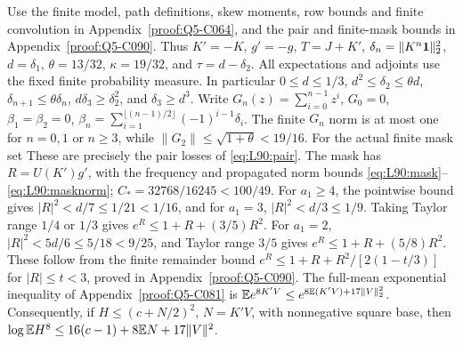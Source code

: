 Use the finite model, path definitions, skew moments, row bounds and
finite convolution in Appendix~\ref{proof:Q5-C064}, and the pair and
finite-mask bounds in Appendix~\ref{proof:Q5-C090}.
Thus \(K'=\allowbreak -K\), \(g'=\allowbreak -g\), \(T=\allowbreak J+K'\),
\(\delta_n=\allowbreak \|K^n\mathbf1\|_2^2\), \(d=\allowbreak \delta_1\),
\(\theta=\allowbreak 13/32\), \(\kappa=\allowbreak 19/32\), and \(\tau=\allowbreak d-\delta_2\).
All expectations and adjoints use the fixed finite probability measure.
In particular \(0\le\allowbreak  d\le\allowbreak 1/3\), \(d^2\le\allowbreak \delta_2\le\allowbreak \theta d\),
\(\delta_{n+1}\le\allowbreak \theta\delta_n\), \(d\delta_3\ge\allowbreak \delta_2^2\),
and \(\delta_3\ge\allowbreak  d^3\).
Write \(G_n(z)=\allowbreak \sum_{i=\allowbreak 0}^{n-1}z^i\), \(G_0=\allowbreak 0\),
\(\beta_1=\allowbreak \beta_2=\allowbreak 0\),
\(\beta_n=\allowbreak \sum_{i=\allowbreak 1}^{\lfloor(n-1)/2\rfloor}(-1)^{i-1}\delta_i\).
The finite \(G_n\) norm is at most one for \(n=\allowbreak 0,\allowbreak 1\) or \(n\ge\allowbreak 3\),
while \(\|G_2\|\le\allowbreak \sqrt{1+\theta}<\allowbreak 19/16\).
For the actual finite mask set
These are precisely the pair losses of \eqref{eq:L90:pair}.
The mask has \(R=\allowbreak U(K')g'\), with the frequency and propagated norm
bounds \eqref{eq:L90:mask}--\eqref{eq:L90:masknorm};
\(C_*=\allowbreak 32768/16245<\allowbreak 100/49\).
For \(a_1\ge\allowbreak 4\), the pointwise bound gives
\(|R|^2<\allowbreak d/7\le\allowbreak 1/21<\allowbreak 1/16\), and for \(a_1=\allowbreak 3\),
\(|R|^2<\allowbreak d/3\le\allowbreak 1/9\). Taking Taylor range \(1/4\) or \(1/3\)
gives \(e^R\le\allowbreak 1+R+(3/5)R^2\).
For \(a_1=\allowbreak 2\), \(|R|^2<\allowbreak 5d/6\le\allowbreak 5/18<\allowbreak 9/25\), and Taylor range
\(3/5\) gives \(e^R\le\allowbreak 1+R+(5/8)R^2\).
These follow from the finite remainder bound
\(e^R\le\allowbreak 1+R+R^2/[2(1-t/3)]\) for \(|R|\le\allowbreak  t<\allowbreak 3\), proved in
Appendix~\ref{proof:Q5-C090}.
The full-mean exponential inequality of Appendix~\ref{proof:Q5-C081}
is \(\mathbb E e^{8K'V}\le\allowbreak  e^{8\mathbb E(K'V)+17\|V\|_2^2}\).
Consequently, if \(H\le\allowbreak (c+N/2)^2\), \(N=\allowbreak K'V\), with nonnegative
square base, then \(\log\mathbb E H^8\le\allowbreak 16(c-1)+8\mathbb E N+17\|V\|^2\).

